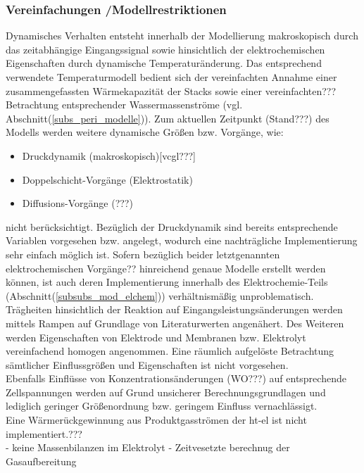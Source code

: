 \documentclass[onecolumn,10pt,titlepage]{article}
\begin{document}
\subsubsection{Vereinfachungen /Modellrestriktionen}
\label{subsubs_Mod_Vereinfach}
Dynamisches Verhalten entsteht innerhalb der Modellierung makroskopisch durch das zeitabhängige Eingangssignal sowie hinsichtlich der elektrochemischen Eigenschaften durch dynamische Temperaturänderung. Das entsprechend verwendete Temperaturmodell bedient sich der vereinfachten Annahme einer zusammengefassten Wärmekapazität der Stacks sowie einer vereinfachten??? Betrachtung entsprechender Wassermassenströme (vgl. Abschnitt(\ref{subs_peri_modelle})). Zum aktuellen Zeitpunkt (Stand???) des Modells werden weitere dynamische Größen bzw. Vorgänge, wie:
\begin{itemize}
	\item Druckdynamik (makroskopisch)[vcgl???]
	\item Doppelschicht-Vorgänge (Elektrostatik)
	\item Diffusions-Vorgänge (???)
\end{itemize}
nicht berücksichtigt. Bezüglich der Druckdynamik sind bereits entsprechende Variablen vorgesehen bzw. angelegt, wodurch eine nachträgliche Implementierung sehr einfach möglich ist. Sofern bezüglich beider letztgenannten elektrochemischen Vorgänge?? hinreichend genaue Modelle erstellt werden können, ist auch deren Implementierung innerhalb des Elektrochemie-Teils (Abschnitt(\ref{subsubs_mod_elchem})) verhältnismäßig unproblematisch.\\
Trägheiten hinsichtlich der Reaktion auf Eingangsleistungsänderungen werden mittels Rampen auf Grundlage von Literaturwerten \cite{Buttler2018} angenähert. 
Des Weiteren werden Eigenschaften von Elektrode und Membranen bzw. Elektrolyt vereinfachend homogen angenommen. Eine räumlich aufgelöste Betrachtung sämtlicher Einflussgrößen und Eigenschaften ist nicht vorgesehen.\\ 
Ebenfalls Einflüsse von Konzentrationsänderungen (WO???) auf entsprechende Zellspannungen werden auf Grund unsicherer Berechnungsgrundlagen und lediglich geringer Größenordnung bzw. geringem Einfluss vernachlässigt.\\
Eine Wärmerückgewinnung aus Produktgasströmen der \gls{ht}-\gls{el} ist nicht implementiert.???\\

- keine Massenbilanzen im Elektrolyt
- Zeitvesetzte berechnug der Gasaufbereitung
\end{document}
